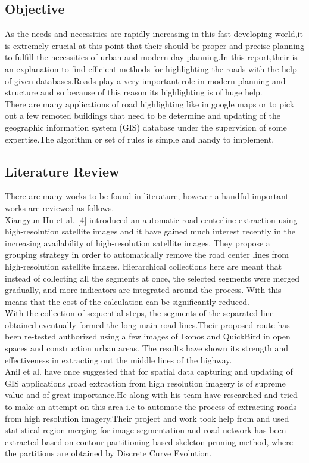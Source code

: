 \documentclass[12pt,a4paper]{article}
\begin{document}
\subsection{\textbf{Objective}}
As the needs and necessities are rapidly increasing in this fast developing world,it is extremely crucial at this point that their should be proper and precise planning to fulfill the necessities of urban and modern-day planning.In this report,their is an explanation to find efficient methods for highlighting the roads with the help of given databases.Roads play a very important role in modern planning and structure and so because of this reason its highlighting is of huge help.\\
There are many applications of road highlighting like in google maps or to pick out a few remoted buildings that need to be determine and updating of the geographic information system (GIS) database under the supervision of some expertise.The algorithm or set of rules is simple and handy to implement.

\subsection{\textbf{Literature Review}}
There are many works to be found in literature, however  a  handful important works
are reviewed as follows.\\
Xiangyun Hu et al. [4] introduced an automatic road centerline extraction using
high-resolution satellite images and it have gained much interest recently
in the increasing availability of high-resolution satellite images. They
propose a grouping strategy in order to automatically remove the road
center lines from high-resolution satellite images. Hierarchical collections here are
meant that instead of collecting all the segments at once, the selected segments were merged
gradually, and more indicators are integrated around the process. With this
means that the cost of the calculation can be significantly reduced.\\
With the collection of sequential steps, the segments of the separated line obtained eventually formed the long main road lines.Their proposed route has been re-tested
authorized using a few images of Ikonos and QuickBird in open spaces and construction
urban areas. The results have shown its strength and effectiveness in
extracting out the middle lines of the highway.\\
Anil et al. have once suggested that for spatial data capturing and updating of GIS applications ,road extraction from high resolution imagery is of supreme value and of great importance.He along with his team have researched and tried to make an attempt on this area i.e to  automate  the  process of extracting roads from high resolution imagery.Their project and work took help from and used  statistical region merging for image segmentation and road network has been extracted based on contour partitioning based skeleton  pruning  method,  where  the  partitions  are  obtained  by  Discrete  Curve Evolution.
\end{document}
